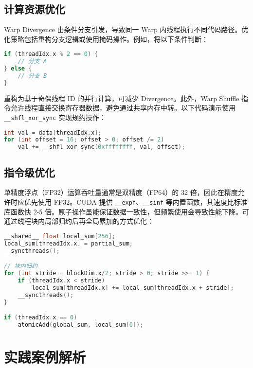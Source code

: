 \section{计算资源优化}
Warp Divergence 由条件分支引发，导致同一 Warp 内线程执行不同代码路径。优化策略包括重构分支逻辑或使用掩码操作。例如，将以下条件判断：\par
\begin{lstlisting}[language=cpp]
if (threadIdx.x % 2 == 0) {
    // 分支 A
} else {
    // 分支 B
}
\end{lstlisting}
重构为基于奇偶线程 ID 的并行计算，可减少 Divergence。此外，Warp Shuffle 指令允许线程直接交换寄存器数据，避免通过共享内存中转。以下代码演示使用 \verb!__shfl_xor_sync! 实现规约操作：\par
\begin{lstlisting}[language=cpp]
int val = data[threadIdx.x];
for (int offset = 16; offset > 0; offset /= 2)
    val += __shfl_xor_sync(0xffffffff, val, offset);
\end{lstlisting}
\section{指令级优化}
单精度浮点（FP32）运算吞吐量通常是双精度（FP64）的 32 倍，因此在精度允许时应优先使用 FP32。CUDA 提供 \verb!__expf!、\verb!__sinf! 等内置函数，其速度比标准库函数快 2-5 倍。原子操作虽能保证数据一致性，但频繁使用会导致性能下降。可通过线程块内局部归约后再全局累加的方式优化：\par
\begin{lstlisting}[language=cpp]
__shared__ float local_sum[256];
local_sum[threadIdx.x] = partial_sum;
__syncthreads();

// 块内归约
for (int stride = blockDim.x/2; stride > 0; stride >>= 1) {
    if (threadIdx.x < stride)
        local_sum[threadIdx.x] += local_sum[threadIdx.x + stride];
    __syncthreads();
}

if (threadIdx.x == 0)
    atomicAdd(global_sum, local_sum[0]);
\end{lstlisting}
\chapter{实践案例解析}
